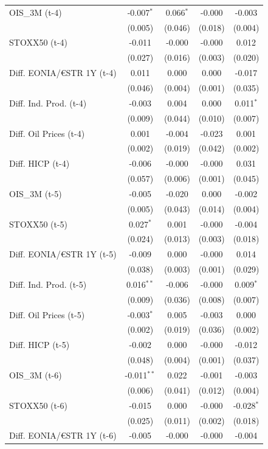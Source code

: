 \begin{longtable}[t]{lcccc}
OIS\_3M (t-4) & -0.007$^{*}$ & 0.066$^{*}$ & -0.000 & -0.003\\
 & (0.005) & (0.046) & (0.018) & (0.004)\\
STOXX50 (t-4) & -0.011 & -0.000 & -0.000 & 0.012\\
 & (0.027) & (0.016) & (0.003) & (0.020)\\
Diff. EONIA/€STR 1Y (t-4) & 0.011 & 0.000 & 0.000 & -0.017\\
 & (0.046) & (0.004) & (0.001) & (0.035)\\
Diff. Ind. Prod. (t-4) & -0.003 & 0.004 & 0.000 & 0.011$^{*}$\\
 & (0.009) & (0.044) & (0.010) & (0.007)\\
Diff. Oil Prices (t-4) & 0.001 & -0.004 & -0.023 & 0.001\\
 & (0.002) & (0.019) & (0.042) & (0.002)\\
Diff. HICP (t-4) & -0.006 & -0.000 & -0.000 & 0.031\\
 & (0.057) & (0.006) & (0.001) & (0.045)\\
OIS\_3M (t-5) & -0.005 & -0.020 & 0.000 & -0.002\\
 & (0.005) & (0.043) & (0.014) & (0.004)\\
STOXX50 (t-5) & 0.027$^{*}$ & 0.001 & -0.000 & -0.004\\
 & (0.024) & (0.013) & (0.003) & (0.018)\\
Diff. EONIA/€STR 1Y (t-5) & -0.009 & 0.000 & -0.000 & 0.014\\
 & (0.038) & (0.003) & (0.001) & (0.029)\\
Diff. Ind. Prod. (t-5) & 0.016$^{**}$ & -0.006 & -0.000 & 0.009$^{*}$\\
 & (0.009) & (0.036) & (0.008) & (0.007)\\
Diff. Oil Prices (t-5) & -0.003$^{*}$ & 0.005 & -0.003 & 0.000\\
 & (0.002) & (0.019) & (0.036) & (0.002)\\
Diff. HICP (t-5) & -0.002 & 0.000 & -0.000 & -0.012\\
 & (0.048) & (0.004) & (0.001) & (0.037)\\
OIS\_3M (t-6) & -0.011$^{**}$ & 0.022 & -0.001 & -0.003\\
 & (0.006) & (0.041) & (0.012) & (0.004)\\
STOXX50 (t-6) & -0.015 & 0.000 & -0.000 & -0.028$^{*}$\\
 & (0.025) & (0.011) & (0.002) & (0.018)\\
Diff. EONIA/€STR 1Y (t-6) & -0.005 & -0.000 & -0.000 & -0.004\\

\end{longtable}
